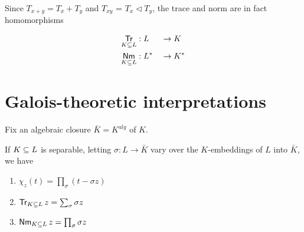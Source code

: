 Since $T_{x+y} = T_x + T_y$ and $T_{xy}$ = $T_x \triangleleft T_y$, the trace and norm are
in fact homomorphisms

\begin{alignat*}{2}
  \Trm &: L      &&\to K \\
  \Nmm &: L^\ast &&\to K^\ast
\end{alignat*}

\section{Galois-theoretic interpretations}

Fix an algebraic closure $\bar{K} = K^{alg}$ of $K$.

\begin{prop}
  If $\ringExtension L K$ is separable, letting $\sigma : L \to \bar{K}$ vary
  over the $K$-embeddings of $L$ into $\bar{K}$, we have
  \begin{enumerate}
  \item \label{chi-z-product-exp} $\chi_z(t) = \prod_\sigma (t - \sigma z)$
  \item $\Tr z = \sum_\sigma \sigma z$
  \item $\Nm z = \prod_\sigma \sigma z$
  \end{enumerate}
\end{prop}


